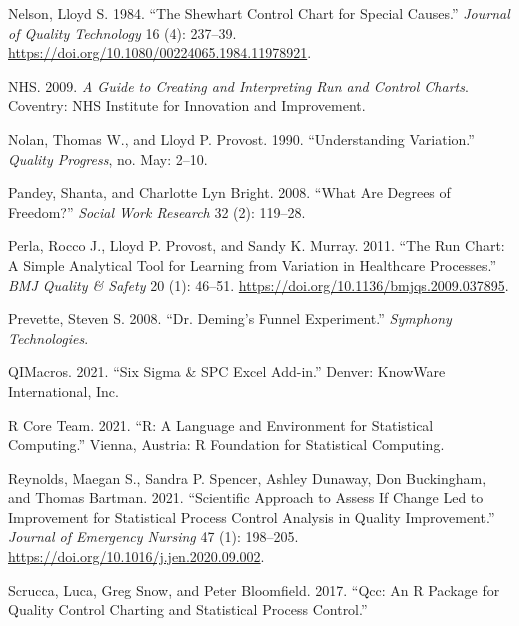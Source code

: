 \documentclass[
]{book}
\newlength{\cslhangindent}
\newenvironment{CSLReferences}[2] %
 {%
  \setlength{\parindent}{0pt}
  \ifodd #1 \everypar{\setlength{\hangindent}{\cslhangindent}}\ignorespaces\fi
  \ifnum #2 > 0
  \setlength{\parskip}{#2\baselineskip}
  \fi
 }%
 {}
\begin{document}
\begin{CSLReferences}{1}{0}
\leavevmode{}%
Nelson, Lloyd S. 1984. {``The Shewhart Control {Chart} for Special Causes.''} \emph{Journal of Quality Technology} 16 (4): 237--39. \url{https://doi.org/10.1080/00224065.1984.11978921}.

\leavevmode{}%
NHS. 2009. \emph{A Guide to Creating and Interpreting Run and Control Charts}. {Coventry}: {NHS Institute for Innovation and Improvement}.

\leavevmode{}%
Nolan, Thomas W., and Lloyd P. Provost. 1990. {``Understanding Variation.''} \emph{Quality Progress}, no. May: 2--10.

\leavevmode{}%
Pandey, Shanta, and Charlotte Lyn Bright. 2008. {``What Are Degrees of Freedom?''} \emph{Social Work Research} 32 (2): 119--28.

\leavevmode{}%
Perla, Rocco J., Lloyd P. Provost, and Sandy K. Murray. 2011. {``The Run Chart: A Simple Analytical Tool for Learning from Variation in Healthcare Processes.''} \emph{BMJ Quality \& Safety} 20 (1): 46--51. \url{https://doi.org/10.1136/bmjqs.2009.037895}.

\leavevmode{}%
Prevette, Steven S. 2008. {``Dr. {Deming}'s Funnel Experiment.''} \emph{Symphony Technologies}.

\leavevmode{}%
QIMacros. 2021. {``Six {Sigma} \& {SPC Excel Add}-in.''} {Denver}: KnowWare International, Inc.

\leavevmode{}%
R Core Team. 2021. {``R: A Language and Environment for Statistical Computing.''} {Vienna, Austria}: {R Foundation for Statistical Computing}.

\leavevmode{}%
Reynolds, Maegan S., Sandra P. Spencer, Ashley Dunaway, Don Buckingham, and Thomas Bartman. 2021. {``Scientific {Approach} to {Assess} If {Change Led} to {Improvement} for {Statistical Process Control Analysis} in {Quality Improvement}.''} \emph{Journal of Emergency Nursing} 47 (1): 198--205. \url{https://doi.org/10.1016/j.jen.2020.09.002}.

\leavevmode{}%
Scrucca, Luca, Greg Snow, and Peter Bloomfield. 2017. {``Qcc: An {R} Package for Quality Control Charting and Statistical Process Control.''}


\end{CSLReferences}
\end{document}

